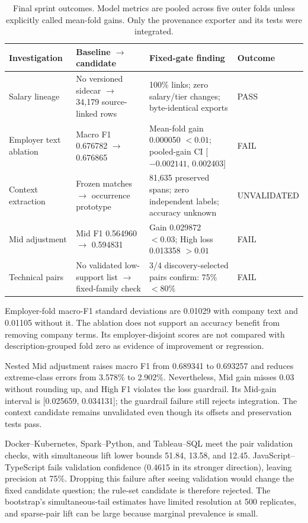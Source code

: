 \documentclass[sigconf,nonacm]{acmart}
\begin{document}
\begin{table}[t]
\caption{Final sprint outcomes. Model metrics are pooled across five outer folds unless explicitly called mean-fold gains. Only the provenance exporter and its tests were integrated.}
\label{tab:sprint}
\centering\small
\begin{tabular}{p{}p{}p{}p{}}
\toprule
Investigation & Baseline $\rightarrow$ candidate & Fixed-gate finding & Outcome \\
\midrule
Salary lineage & No versioned sidecar $\rightarrow$ 34,179 source-linked rows & 100\% links; zero salary/tier changes; byte-identical exports & PASS \\
Employer text ablation & Macro F1 0.676782 $\rightarrow$ 0.676865 & Mean-fold gain 0.000050 $<0.01$; pooled-gain CI [$-0.002141$, 0.002403] & FAIL \\
Context extraction & Frozen matches $\rightarrow$ occurrence prototype & 81,635 preserved spans; zero independent labels; accuracy unknown & UNVALIDATED \\
Mid adjustment & Mid F1 0.564960 $\rightarrow$ 0.594831 & Gain 0.029872 $<0.03$; High loss 0.013358 $>0.01$ & FAIL \\
Technical pairs & No validated low-support list $\rightarrow$ fixed-family check & 3/4 discovery-selected pairs confirm: 75\% $<80\%$ & FAIL \\
\bottomrule
\end{tabular}
\end{table}

Employer-fold macro-F1 standard deviations are 0.01029 with company text and 0.01105 without it. The ablation does not support an accuracy benefit from removing company terms. Its employer-disjoint scores are not compared with description-grouped fold zero as evidence of improvement or regression.

Nested Mid adjustment raises macro F1 from 0.689341 to 0.693257 and reduces extreme-class errors from 3.578\% to 2.902\%. Nevertheless, Mid gain misses 0.03 without rounding up, and High F1 violates the loss guardrail. Its Mid-gain interval is [0.025659, 0.034131]; the guardrail failure still rejects integration. The context candidate remains unvalidated even though its offsets and preservation tests pass.

Docker--Kubernetes, Spark--Python, and Tableau--SQL meet the pair validation checks, with simultaneous lift lower bounds 51.84, 13.58, and 12.45. JavaScript--TypeScript fails validation confidence (0.4615 in its stronger direction), leaving precision at 75\%. Dropping this failure after seeing validation would change the fixed candidate question; the rule-set candidate is therefore rejected. The bootstrap's simultaneous-tail estimates have limited resolution at 500 replicates, and sparse-pair lift can be large because marginal prevalence is small.
\end{document}
